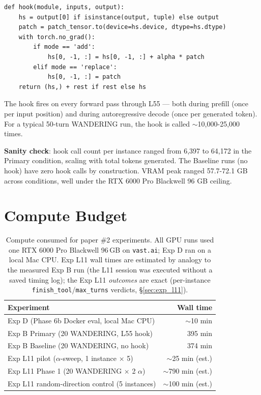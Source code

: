 \documentclass[11pt]{article}
\begin{document}
\begin{verbatim}
def hook(module, inputs, output):
    hs = output[0] if isinstance(output, tuple) else output
    patch = patch_tensor.to(device=hs.device, dtype=hs.dtype)
    with torch.no_grad():
        if mode == 'add':
            hs[0, -1, :] = hs[0, -1, :] + alpha * patch
        elif mode == 'replace':
            hs[0, -1, :] = patch
    return (hs,) + rest if rest else hs
\end{verbatim}

The hook fires on every forward pass through L55 --- both during prefill (once per input position) and during autoregressive decode (once per generated token). For a typical 50-turn WANDERING run, the hook is called $\sim$10{,}000-25{,}000 times.

\textbf{Sanity check}: hook call count per instance ranged from 6{,}397 to 64{,}172 in the Primary condition, scaling with total tokens generated. The Baseline runs (no hook) have zero hook calls by construction. VRAM peak ranged 57.7-72.1 GB across conditions, well under the RTX 6000 Pro Blackwell 96 GB ceiling.

\section{Compute Budget}

\begin{table}[h]
\centering
\small
\caption{Compute consumed for paper \#2 experiments. All GPU runs used one RTX 6000 Pro Blackwell 96\,GB on \texttt{vast.ai}; Exp D ran on a local Mac CPU. Exp L11 wall times are estimated by analogy to the measured Exp B run (the L11 session was executed without a saved timing log); the Exp L11 \emph{outcomes} are exact (per-instance \texttt{finish\_tool}/\texttt{max\_turns} verdicts, \S\ref{sec:exp_l11}).}
\begin{tabular}{lr}
\toprule
Experiment & Wall time \\
\midrule
Exp D (Phase 6b Docker eval, local Mac CPU) & $\sim$10 min \\
Exp B Primary (20 WANDERING, L55 hook) & 395 min \\
Exp B Baseline (20 WANDERING, no hook) & 374 min \\
Exp L11 pilot ($\alpha$-sweep, 1 instance $\times$ 5) & $\sim$25 min (est.) \\
Exp L11 Phase 1 (20 WANDERING $\times$ 2 $\alpha$) & $\sim$790 min (est.) \\
Exp L11 random-direction control (5 instances) & $\sim$100 min (est.) \\
\bottomrule
\end{tabular}
\end{table}
\end{document}
